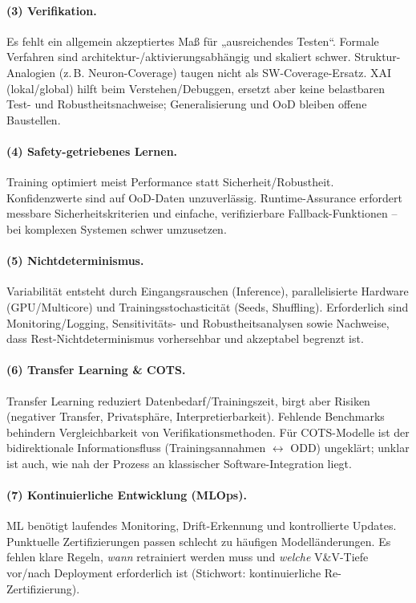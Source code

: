 \paragraph{(3) Verifikation.}
Es fehlt ein allgemein akzeptiertes Maß für „ausreichendes Testen“. Formale Verfahren sind architektur-/aktivierungsabhängig und skaliert schwer. Struktur-Analogien (z.\,B. Neuron-Coverage) taugen nicht als SW-Coverage-Ersatz. XAI (lokal/global) hilft beim Verstehen/Debuggen, ersetzt aber keine belastbaren Test- und Robustheitsnachweise; Generalisierung und OoD bleiben offene Baustellen.

\paragraph{(4) Safety-getriebenes Lernen.}
Training optimiert meist Performance statt Sicherheit/Robustheit. Konfidenzwerte sind auf OoD-Daten unzuverlässig. Runtime-Assurance erfordert messbare Sicherheitskriterien und einfache, verifizierbare Fallback-Funktionen – bei komplexen Systemen schwer umzusetzen.

\paragraph{(5) Nichtdeterminismus.}
Variabilität entsteht durch Eingangsrauschen (Inference), parallelisierte Hardware (GPU/Multicore) und Trainingsstochasticität (Seeds, Shuffling). Erforderlich sind Monitoring/Logging, Sensitivitäts- und Robustheitsanalysen sowie Nachweise, dass Rest-Nichtdeterminismus vorhersehbar und akzeptabel begrenzt ist.

\paragraph{(6) Transfer Learning \& COTS.}
Transfer Learning reduziert Datenbedarf/Trainingszeit, birgt aber Risiken (negativer Transfer, Privatsphäre, Interpretierbarkeit). Fehlende Benchmarks behindern Vergleichbarkeit von Verifikationsmethoden. Für COTS-Modelle ist der bidirektionale Informationsfluss (Trainingsannahmen \(\leftrightarrow\) ODD) ungeklärt; unklar ist auch, wie nah der Prozess an klassischer Software-Integration liegt.

\paragraph{(7) Kontinuierliche Entwicklung (MLOps).}
ML benötigt laufendes Monitoring, Drift-Erkennung und kontrollierte Updates. Punktuelle Zertifizierungen passen schlecht zu häufigen Modelländerungen. Es fehlen klare Regeln, \emph{wann} retrainiert werden muss und \emph{welche} V\&V-Tiefe vor/nach Deployment erforderlich ist (Stichwort: kontinuierliche Re-Zertifizierung).

